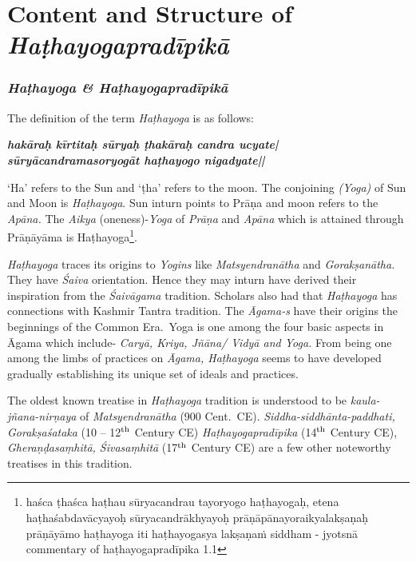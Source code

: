 \part{Content and Structure of \textit{Haṭhayogapradīpikā}}


\section*{\textit{Haṭhayoga \&  Haṭhayogapradīpikā}}

The definition of the term \textit{Haṭhayoga} is as follows:

\begin{shloka}
\textit{\textbf{hakāraḥ kīrtitaḥ sūryaḥ ṭhakāraḥ candra ucyate|}}\\
\textit{\textbf{sūryācandramasoryogāt haṭhayogo nigadyate||}}

\end{shloka}

`Ha' refers to the Sun and `ṭha' refers to the moon. The conjoining \textit{(Yoga)} of Sun and Moon is \textit{Haṭhayoga}. Sun inturn points to Prāṇa and moon refers to the \textit{Apāna.} The \textit{Aikya} (oneness)-\textit{Yoga} of \textit{Prāṇa} and \textit{Apāna} which is attained through Prāṇāyāma is Haṭhayoga\footnote{haśca ṭhaśca haṭhau sūryacandrau tayoryogo haṭhayogaḥ, etena haṭhaśabdavācyayoḥ sūryacandrākhyayoḥ prāṇāpānayoraikyalakṣaṇaḥ prāṇāyāmo haṭhayoga iti haṭhayogasya lakṣaṇaṁ siddham  - jyotsnā commentary of haṭhayogapradīpika 1.1}.

\textit{Haṭhayoga} traces its origins to \textit{Yogins} like \textit{Matsyendranātha} and \textit{Gorakṣanātha.} They have \textit{Śaiva} orientation. Hence they may inturn have derived their inspiration from the \textit{Śaivāgama} tradition. Scholars also had that \textit{Haṭhayoga} has connections with Kashmir Tantra tradition.  The \textit{Āgama-s} have their origins the beginnings of the Common Era.\ Yoga is one among the four basic aspects in Āgama which include- \textit{Caryā, Kriya, Jñāna/ Vidyā and Yoga.} From being one among the limbs of practices on \textit{Āgama, Haṭhayoga} seems to have developed gradually establishing its unique set of ideals and practices.

The oldest known treatise in \textit{Haṭhayoga} tradition is understood to be \textit{kaula-jñana-nirṇaya} of \textit{Matsyendranātha} (900 Cent.\ CE). \textit{Siddha-\break siddhānta-paddhati, Gorakṣaśataka} (10 -- 12$^{\rm th}$ Century CE) \textit{Haṭha\-yoga\-pra\-dī\-pika} (14$^{\rm th}$ Century CE), \textit{Gheraṇḍasaṃhitā, Śivasaṃhitā} (17$^{\rm th}$ Century CE) are a few other noteworthy treatises in this tradition.

